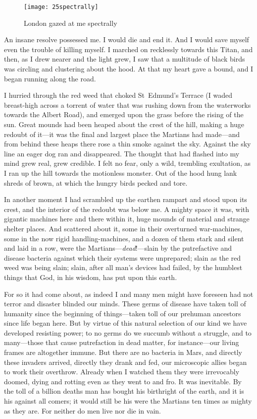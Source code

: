 \begin{figure}[p]
\centering
\texttt{[image: 25spectrally]}
\caption{London gazed at me spectrally}
\end{figure}

An insane resolve possessed me. I would die and end it. And I would save myself even the trouble of killing myself. I marched on recklessly towards this Titan, and then, as I drew nearer and the light grew, I saw that a multitude of black birds was circling and clustering about the hood. At that my heart gave a bound, and I began running along the road.

I hurried through the red weed that choked St~Edmund's Terrace (I waded breast-high across a torrent of water that was rushing down from the waterworks towards the Albert Road), and emerged upon the grass before the rising of the sun. Great mounds had been heaped about the crest of the hill, making a huge redoubt of it—it was the final and largest place the Martians had made—and from behind these heaps there rose a thin smoke against the sky. Against the sky line an eager dog ran and disappeared. The thought that had flashed into my mind grew real, grew credible. I felt no fear, only a wild, trembling exultation, as I ran up the hill towards the motionless monster. Out of the hood hung lank shreds of brown, at which the hungry birds pecked and tore.


In another moment I had scrambled up the earthen rampart and stood upon its crest, and the interior of the redoubt was below me. A mighty space it was, with gigantic machines here and there within it, huge mounds of material and strange shelter places. And scattered about it, some in their overturned war-machines, some in the now rigid handling-machines, and a dozen of them stark and silent and laid in a row, were the Martians—\textit{dead}!—slain by the putrefactive and disease bacteria against which their systems were unprepared; slain as the red weed was being slain; slain, after all man's devices had failed, by the humblest things that God, in his wisdom, has put upon this earth.

For so it had come about, as indeed I and many men might have foreseen had not terror and disaster blinded our minds. These germs of disease have taken toll of humanity since the beginning of things—taken toll of our prehuman ancestors since life began here. But by virtue of this natural selection of our kind we have developed resisting power; to no germs do we succumb without a struggle, and to many—those that cause putrefaction in dead matter, for instance—our living frames are altogether immune. But there are no bacteria in Mars, and directly these invaders arrived, directly they drank and fed, our microscopic allies began to work their overthrow. Already when I watched them they were irrevocably doomed, dying and rotting even as they went to and fro. It was inevitable. By the toll of a billion deaths man has bought his birthright of the earth, and it is his against all comers; it would still be his were the Martians ten times as mighty as they are. For neither do men live nor die in vain.



